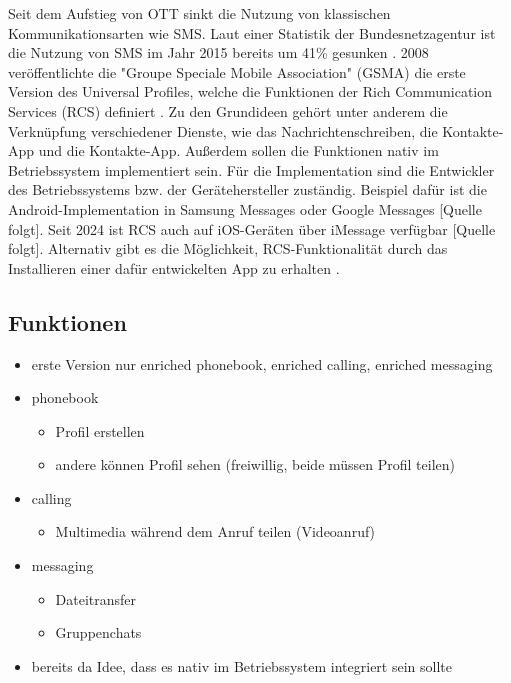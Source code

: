 \documentclass[conference]{IEEEtran}
\begin{document}
Seit dem Aufstieg von OTT sinkt die Nutzung von klassischen Kommunikationsarten wie SMS.
Laut einer Statistik der Bundesnetzagentur ist die Nutzung von SMS im Jahr 2015 bereits um 41\% gesunken \cite{ottmobinter}.
2008 veröffentlichte die "Groupe Speciale Mobile Association" (GSMA) die erste Version des Universal Profiles, welche die Funktionen der Rich Communication Services (RCS) definiert \cite{rcsuite}.
Zu den Grundideen gehört unter anderem die Verknüpfung verschiedener Dienste, wie das Nachrichtenschreiben, die Kontakte-App und die Kontakte-App.
Außerdem sollen die Funktionen nativ im Betriebssystem implementiert sein.
Für die Implementation sind die Entwickler des Betriebssystems bzw. der Gerätehersteller zuständig.
Beispiel dafür ist die Android-Implementation in Samsung Messages oder Google Messages [Quelle folgt].
Seit 2024 ist RCS auch auf iOS-Geräten über iMessage verfügbar [Quelle folgt].
Alternativ gibt es die Möglichkeit, RCS-Funktionalität durch das Installieren einer dafür entwickelten App zu erhalten \cite{uniprof}.

\subsection{Funktionen}

\begin{itemize}
    \item erste Version nur enriched phonebook, enriched calling, enriched messaging
    \item phonebook
          \begin{itemize}
              \item Profil erstellen
              \item andere können Profil sehen (freiwillig, beide müssen Profil teilen)
          \end{itemize}
    \item calling
          \begin{itemize}
              \item Multimedia während dem Anruf teilen (Videoanruf)
          \end{itemize}
    \item messaging
          \begin{itemize}
              \item Dateitransfer
              \item Gruppenchats
          \end{itemize}
    \item bereits da Idee, dass es nativ im Betriebssystem integriert sein sollte
\end{itemize}
\cite{rcsuite}
\end{document}
